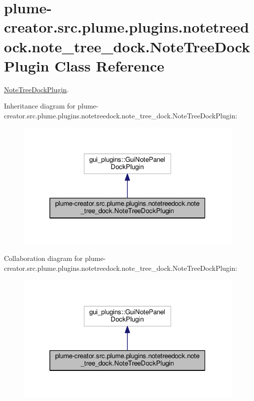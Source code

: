 \hypertarget{classplume-creator_1_1src_1_1plume_1_1plugins_1_1notetreedock_1_1note__tree__dock_1_1_note_tree_dock_plugin}{}\section{plume-\/creator.src.\+plume.\+plugins.\+notetreedock.\+note\+\_\+tree\+\_\+dock.\+Note\+Tree\+Dock\+Plugin Class Reference}
\label{classplume-creator_1_1src_1_1plume_1_1plugins_1_1notetreedock_1_1note__tree__dock_1_1_note_tree_dock_plugin}


\hyperlink{classplume-creator_1_1src_1_1plume_1_1plugins_1_1notetreedock_1_1note__tree__dock_1_1_note_tree_dock_plugin}{Note\+Tree\+Dock\+Plugin}.  




Inheritance diagram for plume-\/creator.src.\+plume.\+plugins.\+notetreedock.\+note\+\_\+tree\+\_\+dock.\+Note\+Tree\+Dock\+Plugin\+:\nopagebreak
\begin{figure}[H]
\begin{center}
\leavevmode
\includegraphics[width=316pt]{classplume-creator_1_1src_1_1plume_1_1plugins_1_1notetreedock_1_1note__tree__dock_1_1_note_tree_dock_plugin__inherit__graph}
\end{center}
\end{figure}


Collaboration diagram for plume-\/creator.src.\+plume.\+plugins.\+notetreedock.\+note\+\_\+tree\+\_\+dock.\+Note\+Tree\+Dock\+Plugin\+:\nopagebreak
\begin{figure}[H]
\begin{center}
\leavevmode
\includegraphics[width=316pt]{classplume-creator_1_1src_1_1plume_1_1plugins_1_1notetreedock_1_1note__tree__dock_1_1_note_tree_dock_plugin__coll__graph}
\end{center}
\end{figure}
